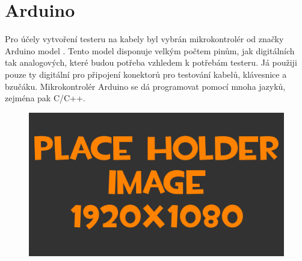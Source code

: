 
\section{Arduino}
Pro účely vytvoření testeru na kabely byl vybrán mikrokontrolér od značky Arduino model \ardMeg. Tento model disponuje velkým počtem pinům, jak digitálních tak analogových, které budou potřeba vzhledem k potřebám testeru. Já použiji pouze ty digitální pro připojení konektorů pro testování kabelů, klávesnice a bzučáku. Mikrokontrolér Arduino se dá programovat pomocí mnoha jazyků, zejména pak C/C++.

\begin{figure}[h!]
	\centering
	\includegraphics[width=\textwidth]{pictures/placeHolderFHD.png}
    	\caption{\ardMeg}
   	\label{fig:arduinoMega}
\end{figure}